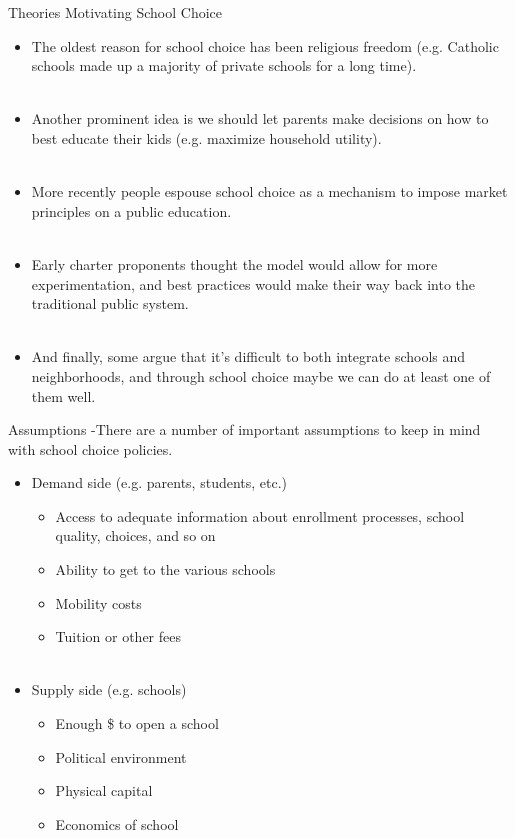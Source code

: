 \documentclass{beamer}
\begin{document}
\begin{frame}[<+->]{Theories Motivating School Choice}
	\begin{itemize}
		\item The oldest reason for school choice has been religious freedom (e.g. Catholic schools made up a majority of private schools for a long time).  \\~\\
		\item Another prominent idea is we should let parents make decisions on how to best educate their kids (e.g. maximize household utility). \\~\\
		\item More recently people espouse school choice as a mechanism to impose market principles on a public education. \\~\\
		\item Early charter proponents thought the model would allow for more experimentation, and best practices would make their way back into the traditional public system. \\~\\
		\item And finally, some argue that it's difficult to both integrate schools and neighborhoods, and through school choice maybe we can do at least one of them well. 
	
	\end{itemize}

\end{frame}

\begin{frame}[<+->]{Assumptions}
-There are a number of important assumptions to keep in mind with school choice policies. 
\begin{itemize}
	\item Demand side (e.g. parents, students, etc.)
	\begin{itemize}
		\item Access to adequate information about enrollment processes, school quality, choices, and so on
		\item Ability to get to the various schools
		\item Mobility costs
		\item Tuition or other fees \\~\\
	\end{itemize}
	\item Supply side (e.g. schools)
	\begin{itemize}
		\item Enough \$ to open a school
		\item Political environment
		\item Physical capital
		\item Economics of school
	\end{itemize}
\end{itemize}
\end{frame}
\end{document}
